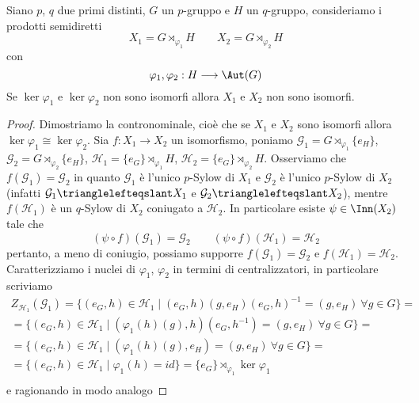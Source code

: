 \documentclass[11pt]{scrartcl}
\begin{document}
\begin{proposition}
    Siano $p$, $q$ due primi distinti, $G$ un $p$-gruppo e $H$ un $q$-gruppo,
    consideriamo i prodotti semidiretti 
    \[
        X_1 = G\rtimes_{\varphi_1}H \qquad X_2 = G\rtimes_{\varphi_2}H
    \]
    con 
    \[
        \varphi_1, \varphi_2 :H \longrightarrow \Aut(G)
    \]
    Se $\ker\varphi_1$ e $\ker\varphi_2$ non sono isomorfi allora $X_1$ e 
    $X_2$ non sono isomorfi.
\end{proposition}

\begin{proof}
    Dimostriamo la contronominale, cioè che se $X_1$ e $X_2$ sono isomorfi
    allora $\ker\varphi_1 \cong \ker\varphi_2$.\newline
    Sia $f: X_1\longrightarrow X_2$ un isomorfismo, poniamo $\mathcal{G}_1 = 
    G\rtimes_{\varphi_1}\{e_H\}$, $\mathcal{G}_2 = G\rtimes_{\varphi_2}\{e_H\}$,
    $\mathcal{H}_1 = \{e_G\}\rtimes_{\varphi_1}H$, $\mathcal{H}_2 = \{e_G\}\rtimes_{\varphi_2}H$.
    Osserviamo che $f(\mathcal{G}_1) = \mathcal{G}_2$ in quanto $\mathcal{G}_1$
    è l'unico $p$-Sylow di $X_1$ e $\mathcal{G}_2$ è l'unico $p$-Sylow di $X_2$
    (infatti $\mathcal{G}_1 \trianglelefteqslant X_1$ e $\mathcal{G}_2 
    \trianglelefteqslant X_2$), mentre $f(\mathcal{H}_1)$ è un $q$-Sylow di $X_2$
    coniugato a $\mathcal{H}_2$. In particolare esiste $\psi \in \Inn(X_2)$
    tale che
    \[
        (\psi\circ f)(\mathcal{G}_1) = \mathcal{G}_2 \qquad 
        (\psi\circ f)(\mathcal{H}_1) = \mathcal{H}_2
    \]
    pertanto, a meno di coniugio, possiamo supporre $f(\mathcal{G}_1) = \mathcal{G}_2$ e 
    $f(\mathcal{H}_1) = \mathcal{H}_2$. Caratterizziamo i nuclei di $\varphi_1$, 
    $\varphi_2$ in termini di centralizzatori, in particolare scriviamo
    \begin{multline*}
        Z_{\mathcal{H}_1}(\mathcal{G}_1) = \{(e_G, h) \in \mathcal{H}_1\mid
        (e_G, h)(g, e_H)(e_G, h)^{-1} = (g, e_H)~\forall g \in G\} = \\
        = \{(e_G, h)\in \mathcal{H}_1 \mid (\varphi_1(h)(g), h)(e_G, h^{-1})
        = (g, e_H)~\forall g \in G\} = \\
        = \{(e_G, h) \in \mathcal{H}_1\mid (\varphi_1(h)(g), e_H) = (g, e_H)~
        \forall g \in G\} = \\
        = \{(e_G, h) \in \mathcal{H}_1\mid \varphi_1(h) = id\} =
        \{e_G\}\rtimes_{\varphi_1}\ker\varphi_1\\
    \end{multline*}
    e ragionando in modo analogo

\end{proof}
\end{document}
